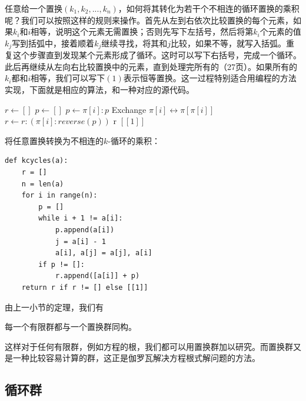 \documentclass{article}
\begin{document}
任意给一个置换$(k_1, k_2, ..., k_n)$，如何将其转化为若干个不相连的循环置换的乘积呢？我们可以按照这样的规则来操作。首先从左到右依次比较置换的每个元素，如果$k_i$和$i$相等，说明这个元素无需置换；否则先写下左括号，然后将第$k_i$个元素的值$k_j$写到括弧中，接着顺着$k_j$继续寻找，将其和$j$比较，如果不等，就写入括弧。重复这个步骤直到发现某个元素形成了循环。这时可以写下右括号，完成一个循环。此后再继续从左向右比较置换中的元素，直到处理完所有的\cite{Armstrong1988}（27页）。如果所有的$k_i$都和$i$相等，我们可以写下$(1)$表示恒等置换。这一过程特别适合用编程的方法实现，下面就是相应的算法，和一种对应的源代码。

\begin{algorithmic}
  \State $r \gets []$
    \State $p \gets []$
      \State $p \gets \pi[i]:p$
      \State Exchange $\pi[i] \leftrightarrow \pi[\pi[i]]$
    \EndWhile
      \State $r \gets r:(\pi[i]:reverse(p))$
    \EndIf
  \EndFor
    \State \Return r
  \Else
    \State \Return $[[1]]$ 
  \EndIf
\EndFunction
\end{algorithmic}

将任意置换转换为不相连的$k$-循环的乘积：
\lstset{language=Python}
\begin{lstlisting}
def kcycles(a):
    r = []
    n = len(a)
    for i in range(n):
        p = []
        while i + 1 != a[i]:
            p.append(a[i])
            j = a[i] - 1
            a[i], a[j] = a[j], a[i]
        if p != []:
            r.append([a[i]] + p)
    return r if r != [] else [[1]]
\end{lstlisting}

由上一小节的定理，我们有

\begin{theorem}
每一个有限群都与一个置换群同构。
\end{theorem}

这样对于任何有限群，例如方程的根，我们都可以用置换群加以研究。而置换群又是一种比较容易计算的群，这正是伽罗瓦解决方程根式解问题的方法。

\begin{Exercise}
\end{Exercise}

\subsection{循环群}
\end{document}
